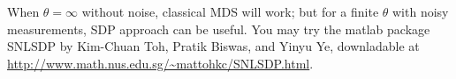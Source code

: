 \documentclass[11pt]{article}
\begin{document}
When $\theta=\infty$ without noise, classical MDS will work; but for a finite $\theta$ with noisy measurements, SDP approach can be useful. You may try the matlab package SNLSDP by Kim-Chuan Toh, Pratik Biswas, and Yinyu Ye, downladable at \url{http://www.math.nus.edu.sg/~mattohkc/SNLSDP.html}. 



%
%
%



%
%
%
%
%
%
%
\end{document}
